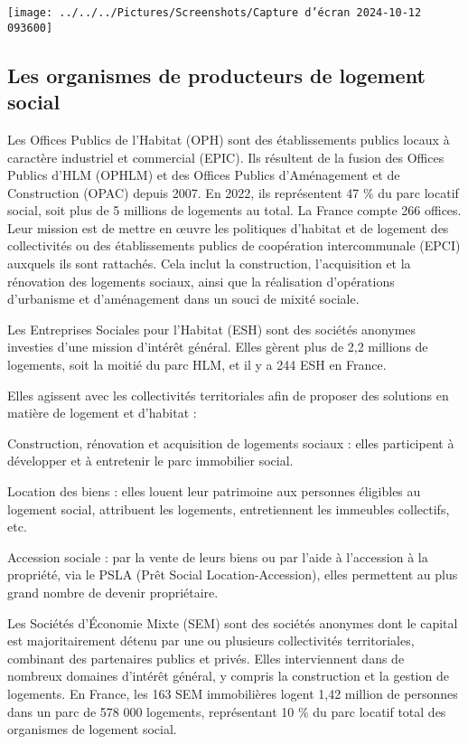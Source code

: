 \documentclass[a4paper, 12pt]{report}
\begin{document}
\begin{center}
	\texttt{[image: ../../../Pictures/Screenshots/Capture d'écran 2024-10-12 093600]}
\end{center}

\subsection{Les organismes de producteurs de logement social}

Les Offices Publics de l’Habitat (OPH) sont des établissements publics locaux à caractère industriel et commercial (EPIC). Ils résultent de la fusion des Offices Publics d’HLM (OPHLM) et des Offices Publics d’Aménagement et de Construction (OPAC) depuis 2007. En 2022, ils représentent 47 \% du parc locatif social, soit plus de 5 millions de logements au total. La France compte 266 offices. Leur mission est de mettre en œuvre les politiques d’habitat et de logement des collectivités ou des établissements publics de coopération intercommunale (EPCI) auxquels ils sont rattachés. Cela inclut la construction, l’acquisition et la rénovation des logements sociaux, ainsi que la réalisation d’opérations d’urbanisme et d’aménagement dans un souci de mixité sociale.

Les Entreprises Sociales pour l’Habitat (ESH) sont des sociétés anonymes investies d’une mission d’intérêt général. Elles gèrent plus de 2,2 millions de logements, soit la moitié du parc HLM, et il y a 244 ESH en France.

Elles agissent avec les collectivités territoriales afin de proposer des solutions en matière de logement et d’habitat : 

Construction, rénovation et acquisition de logements sociaux : elles participent à développer et à entretenir le parc immobilier social.

Location des biens : elles louent leur patrimoine aux personnes éligibles au logement social, attribuent les logements, entretiennent les immeubles collectifs, etc.

Accession sociale : par la vente de leurs biens ou par l’aide à l’accession à la propriété, via le PSLA (Prêt Social Location-Accession), elles permettent au plus grand nombre de devenir propriétaire.

Les Sociétés d’Économie Mixte (SEM) sont des sociétés anonymes dont le capital est majoritairement détenu par une ou plusieurs collectivités territoriales, combinant des partenaires publics et privés. Elles interviennent dans de nombreux domaines d’intérêt général, y compris la construction et la gestion de logements. En France, les 163 SEM immobilières logent 1,42 million de personnes dans un parc de 578 000 logements, représentant 10 \% du parc locatif total des organismes de logement social.
\end{document}
